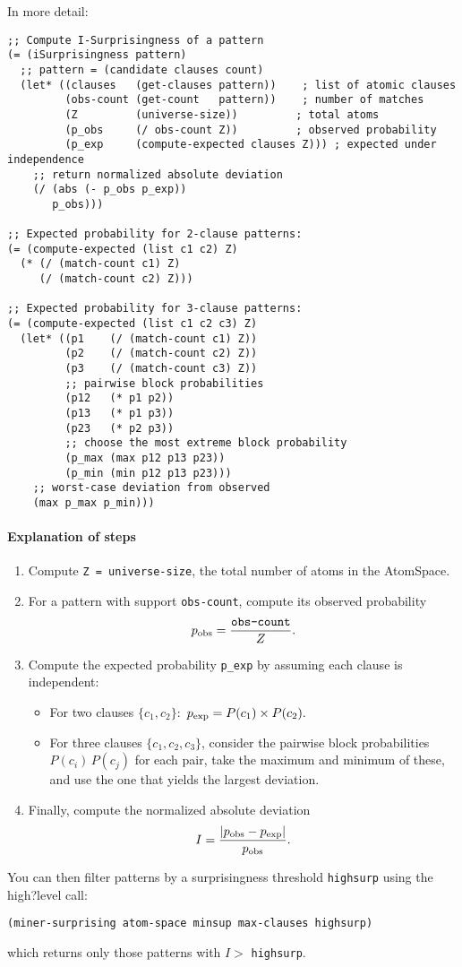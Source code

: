 \documentclass{article}
\begin{document}
In more detail:

\begin{verbatim}
;; Compute I-Surprisingness of a pattern
(= (iSurprisingness pattern)
  ;; pattern = (candidate clauses count)
  (let* ((clauses   (get-clauses pattern))    ; list of atomic clauses
         (obs-count (get-count   pattern))    ; number of matches
         (Z         (universe-size))         ; total atoms
         (p_obs     (/ obs-count Z))         ; observed probability
         (p_exp     (compute-expected clauses Z))) ; expected under independence
    ;; return normalized absolute deviation
    (/ (abs (- p_obs p_exp))
       p_obs)))

;; Expected probability for 2-clause patterns:
(= (compute-expected (list c1 c2) Z)
  (* (/ (match-count c1) Z)
     (/ (match-count c2) Z)))

;; Expected probability for 3-clause patterns:
(= (compute-expected (list c1 c2 c3) Z)
  (let* ((p1    (/ (match-count c1) Z))
         (p2    (/ (match-count c2) Z))
         (p3    (/ (match-count c3) Z))
         ;; pairwise block probabilities
         (p12   (* p1 p2))
         (p13   (* p1 p3))
         (p23   (* p2 p3))
         ;; choose the most extreme block probability
         (p_max (max p12 p13 p23))
         (p_min (min p12 p13 p23)))
    ;; worst-case deviation from observed
    (max p_max p_min)))
\end{verbatim}

\paragraph{Explanation of steps}

\begin{enumerate}
  \item Compute \texttt{Z = universe-size}, the total number of atoms in the AtomSpace.
  \item For a pattern with support \texttt{obs-count}, compute its observed probability
        \[
          p_{\rm obs} = \frac{\texttt{obs-count}}{Z}.
        \]
  \item Compute the expected probability \texttt{p\_exp} by assuming each clause is independent:
  \begin{itemize}
    \item For two clauses \(\{c_1,c_2\}\):
      \(\,p_{\rm exp} = P(c_1)\times P(c_2).\)
    \item For three clauses \(\{c_1,c_2,c_3\}\), consider the pairwise block probabilities
      \(P(c_i)\,P(c_j)\) for each pair, take the maximum and minimum of these, and use the one that yields the largest deviation.
  \end{itemize}
  \item Finally, compute the normalized absolute deviation
        \[
          I = \frac{\lvert p_{\rm obs} - p_{\rm exp}\rvert}{p_{\rm obs}}.
        \]
\end{enumerate}

You can then filter patterns by a surprisingness threshold \texttt{highsurp} using the high?level call:
\begin{verbatim}
(miner-surprising atom-space minsup max-clauses highsurp)
\end{verbatim}
which returns only those patterns with \(I >\) \texttt{highsurp}.
\end{document}
